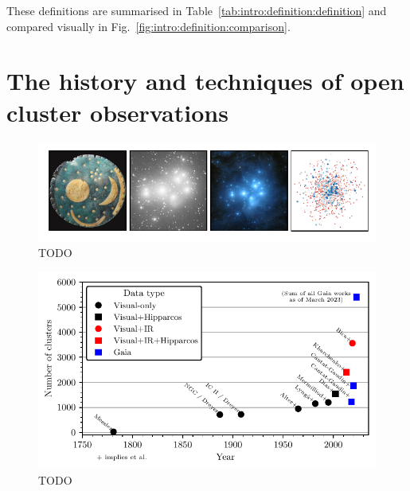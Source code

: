 These definitions are summarised in Table~\ref{tab:intro:definition:definition} and compared visually in Fig.~\ref{fig:intro:definition:comparison}.





\section{The history and techniques of open cluster observations}
\label{sec:intro:history}

\blindtext

\begin{figure}[tb]
	\includegraphics[width=\textwidth]{fig/c1/pleiades.pdf}
	\caption{TODO}
	\label{fig:intro:history:pleiades}
\end{figure}

\begin{figure}[tb]
	\includegraphics[width=\textwidth]{fig/c1/catalogues.pdf}
	\caption{TODO}
	\label{fig:intro::history:catalogues}
\end{figure}


